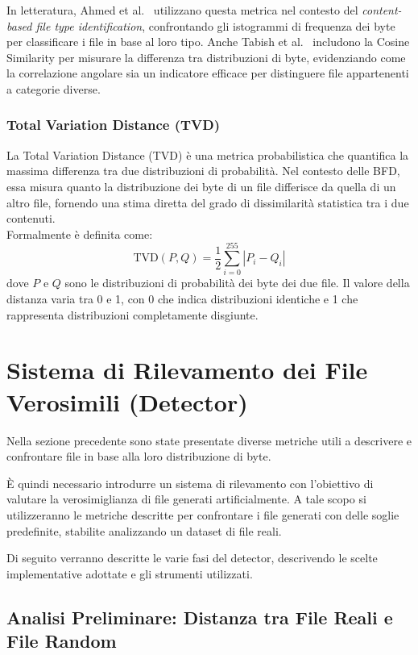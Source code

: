 \documentclass{report}
\begin{document}
In letteratura, Ahmed et al.~\cite{ahmed2010cosine} utilizzano questa metrica nel contesto del \emph{content-based file type identification}, confrontando gli istogrammi di frequenza dei byte per classificare i file in base al loro tipo.
Anche Tabish et al.~\cite{tabish2009malware} includono la Cosine Similarity per misurare la differenza tra distribuzioni di byte, evidenziando come la correlazione angolare sia un indicatore efficace per distinguere file appartenenti a categorie diverse.


\subsection{Total Variation Distance (TVD)}

La Total Variation Distance (TVD) è una metrica probabilistica che quantifica la massima differenza tra due distribuzioni di probabilità.
Nel contesto delle BFD, essa misura quanto la distribuzione dei byte di un file differisce da quella di un altro file, fornendo una stima diretta del grado di dissimilarità statistica tra i due contenuti.\\
Formalmente è definita come:
\[
\mathrm{TVD}(P,Q) = \frac{1}{2} \sum_{i=0}^{255} |P_i - Q_i|
\]     
dove $P$ e $Q$ sono le distribuzioni di probabilità dei byte dei due file.
Il valore della distanza varia tra 0 e 1, con 0 che indica distribuzioni identiche e 1 che rappresenta distribuzioni completamente disgiunte.



\chapter{Sistema di Rilevamento dei File Verosimili (Detector)}

Nella sezione precedente sono state presentate diverse metriche utili a descrivere e confrontare file in base alla loro distribuzione di byte.

\`{E} quindi necessario introdurre un sistema di rilevamento con l'obiettivo di valutare la verosimiglianza di file generati artificialmente.
A tale scopo si utilizzeranno le metriche descritte per confrontare i file generati con delle soglie predefinite, stabilite analizzando un dataset di file reali.

Di seguito verranno descritte le varie fasi del detector, descrivendo le scelte implementative adottate e gli strumenti utilizzati.


\section{Analisi Preliminare: Distanza tra File Reali e File Random}
\end{document}
